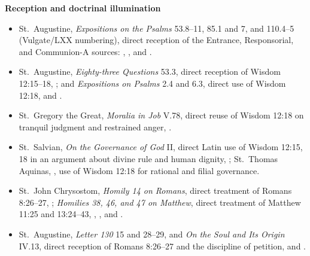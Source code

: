 \begin{deepstudy}
\textbf{Reception and doctrinal illumination}
{\footnotesize
\begin{itemize}[itemsep=0em,topsep=0.15em,parsep=0pt]
\item St.~Augustine, \emph{Expositions on the Psalms} 53.8--11, 85.1 and 7, and 110.4--5 (Vulgate/LXX numbering), direct reception of the Entrance, Responsorial, and Communion-A sources: , , and .
\item St.~Augustine, \emph{Eighty-three Questions} 53.3, direct reception of Wisdom 12:15--18, ; and \emph{Expositions on Psalms} 2.4 and 6.3, direct use of Wisdom 12:18,  and .
\item St.~Gregory the Great, \emph{Moralia in Job} V.78, direct reuse of Wisdom 12:18 on tranquil judgment and restrained anger, .
\item St.~Salvian, \emph{On the Governance of God} II, direct Latin use of Wisdom 12:15, 18 in an argument about divine rule and human dignity, ; St.~Thomas Aquinas, , use of Wisdom 12:18 for rational and filial governance.
\item St.~John Chrysostom, \emph{Homily 14 on Romans}, direct treatment of Romans 8:26--27, ; \emph{Homilies 38, 46, and 47 on Matthew}, direct treatment of Matthew 11:25 and 13:24--43, , , and .
\item St.~Augustine, \emph{Letter 130} 15 and 28--29, and \emph{On the Soul and Its Origin} IV.13, direct reception of Romans 8:26--27 and the discipline of petition,  and .

\end{itemize}}
\end{deepstudy}

